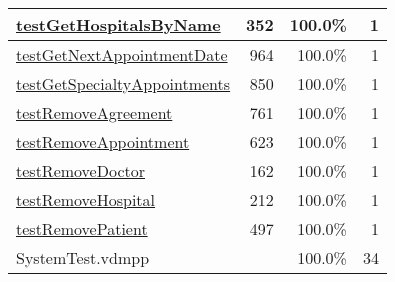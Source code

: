 \begin{longtable}{|l|r|r|r|}
\hline
\hyperref[testGetHospitalsByName:352]{testGetHospitalsByName} & 352&100.0\% & 1 \\
\hline
\hyperref[testGetNextAppointmentDate:964]{testGetNextAppointmentDate} & 964&100.0\% & 1 \\
\hline
\hyperref[testGetSpecialtyAppointments:850]{testGetSpecialtyAppointments} & 850&100.0\% & 1 \\
\hline
\hyperref[testRemoveAgreement:761]{testRemoveAgreement} & 761&100.0\% & 1 \\
\hline
\hyperref[testRemoveAppointment:623]{testRemoveAppointment} & 623&100.0\% & 1 \\
\hline
\hyperref[testRemoveDoctor:162]{testRemoveDoctor} & 162&100.0\% & 1 \\
\hline
\hyperref[testRemoveHospital:212]{testRemoveHospital} & 212&100.0\% & 1 \\
\hline
\hyperref[testRemovePatient:497]{testRemovePatient} & 497&100.0\% & 1 \\
\hline
\hline
SystemTest.vdmpp & & 100.0\% & 34 \\
\hline
\end{longtable}

